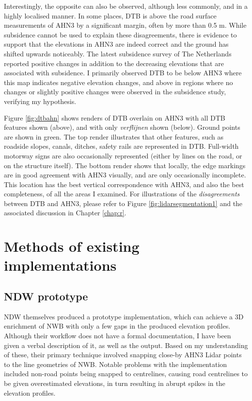 Interestingly, the opposite can also be observed, although less commonly, and in a highly localised manner. In some places, DTB is above the road surface measurements of AHN3 by a significant margin, often by more than 0.5 m. While subsidence cannot be used to explain these disagreements, there is evidence to support that the elevations in AHN3 are indeed correct and the ground has shifted upwards noticeably. The latest subsidence survey of The Netherlands reported positive changes in addition to the decreasing elevations that are associated with subsidence. I primarily observed DTB to be below AHN3 where this map indicates negative elevation changes, and above in regions where no changes or slightly positive changes were observed in the subsidence study, verifying my hypothesis.

Figure \ref{fig:dtbahn} shows renders of DTB overlain on AHN3 with all DTB features shown (above), and with only \textit{verflijnen} shown (below). Ground points are shown in green. The top render illustrates that other features, such as roadside slopes, canals, ditches, safety rails are represented in DTB. Full-width motorway signs are also occasionally represented (either by lines on the road, or on the structure itself). The bottom render shows that locally, the edge markings are in good agreement with AHN3 visually, and are only occasionally incomplete. This location has the best vertical correspondence with AHN3, and also the best completeness, of all the areas I examined. For illustrations of the \textit{disagreements} between DTB and AHN3, please refer to Figure \ref{fig:lidarsegmentation1} and the associated discussion in Chapter \ref{chap:r}.

\section{Methods of existing implementations}
\label{sec:methodsexisting}

\subsection{NDW prototype}
\label{sub:ndwprototype}

NDW themselves produced a prototype implementation, which can achieve a 3D enrichment of NWB with only a few gaps in the produced elevation profiles. Although their workflow does not have a formal documentation, I have been given a verbal description of it, as well as the output. Based on my understanding of these, their primary technique involved snapping close-by AHN3 Lidar points to the line geometries of NWB. Notable problems with the implementation included non-road points being snapped to centrelines, causing road centrelines to be given overestimated elevations, in turn resulting in abrupt spikes in the elevation profiles.

